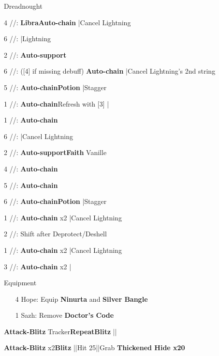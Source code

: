 \begin{fight}{Dreadnought}
	\item [4] \rav/\rav/\sab: \textbf{Libra}\to \textbf{Auto-chain} |Cancel Lightning
	\item [6] \rav/\rav/\rav: |Lightning
	\item [2] \syn/\com/\sab: \textbf{Auto-support}
	\item [6] \rav/\rav/\rav: ([4] if missing debuff) \textbf{Auto-chain} |Cancel Lightning's 2nd string
	\item [5] \rav/\rav/\rav: \textbf{Auto-chain}\to \textbf{\textbf{Potion}} |Stagger
	\item [1] \rav/\com/\rav: \textbf{Auto-chain}\to Refresh with [3] |\skip
	\item [1] \rav/\com/\rav: \textbf{Auto-chain}
	\item [6] \rav/\rav/\rav: |Cancel Lightning
	\item [2] \syn/\com/\sab: \textbf{Auto-support}\to \textbf{Faith} Vanille
	\item [4] \rav/\rav/\sab: \textbf{Auto-chain}
	\item [5] \rav/\rav/\rav: \textbf{Auto-chain}
	\item [6] \rav/\rav/\rav: \textbf{Auto-chain}\to \textbf{\textbf{Potion}} |Stagger
	\item [1] \rav/\com/\rav: \textbf{Auto-chain} x2 |Cancel Lightning
	\item [2] \syn/\com/\sab: Shift after Deprotect/Deshell
	\item [1] \rav/\com/\rav: \textbf{Auto-chain} x2 |Cancel Lightning
	\item [3] \rav/\com/\rav: \textbf{Auto-chain} x2 |\skip
\end{fight}
\begin{menu}
	\item Equipment
	\begin{itemize}
		\item [4] Hope: Equip \textbf{Ninurta} and \textbf{Silver Bangle}
		\item [1] Sazh: Remove \textbf{Doctor's Code}
	\end{itemize}
\end{menu}
\begin{mainlist}
	\item {}
	\item {} \textbf{Attack-Blitz} Tracker\to [2] \textbf{Repeat}\to \textbf{Blitz} ||\skip
	\item {} \textbf{Attack-Blitz} x2\to \textbf{Blitz} |\skip|Hit 25|\skip|Grab \textbf{Thickened Hide x20}
\end{mainlist}
